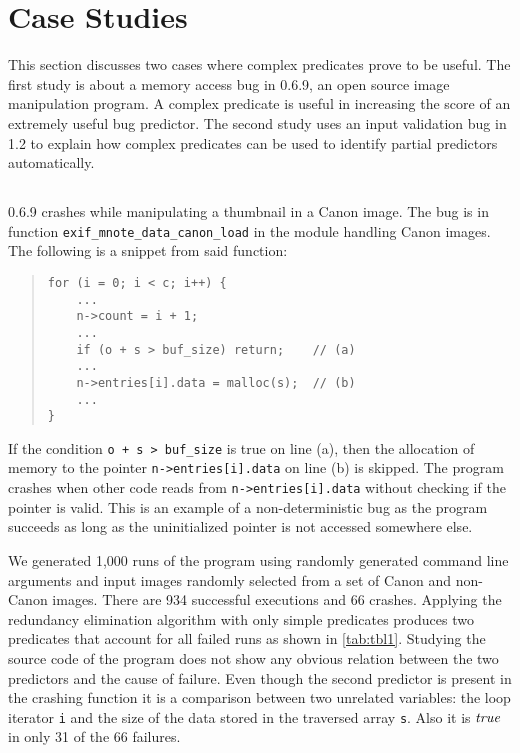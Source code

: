 
\section{Case Studies}
\label{sec-qual}
This section discusses two cases where complex predicates prove to be useful.  The first study is about a memory access bug in  0.6.9, an open source image manipulation program.  A complex predicate is useful in increasing the score of an extremely useful bug predictor.  The second study uses an input validation bug in  1.2 to explain how complex predicates can be used to identify partial predictors automatically.

\subsection{\large\textbf{}}
\label{sec-exif}

 0.6.9 crashes while manipulating a thumbnail in a Canon image.  The bug is in function \texttt{exif\_mnote\_data\_canon\_load} in the module handling Canon images.  The following is a snippet from said function:
\begin{quote}
\small
\begin{verbatim}
for (i = 0; i < c; i++) {
    ...
    n->count = i + 1;
    ...
    if (o + s > buf_size) return;    // (a)
    ...
    n->entries[i].data = malloc(s);  // (b)
    ...
}
\end{verbatim}
\end{quote}

If the condition \texttt{o + s > buf\_size} is true on line (a), then the allocation of memory to the pointer \texttt{n->entries[i].data} on line (b) is skipped.  The program crashes when other code reads from \texttt{n->entries[i].data} without checking if the pointer is valid.  This is an example of a non-deterministic bug as the program succeeds as long as the uninitialized pointer is not accessed somewhere else.

We generated 1,000 runs of the program using randomly generated command line arguments and input images randomly selected from a set of Canon and non-Canon images.  There are 934 successful executions and 66 crashes.  Applying the redundancy elimination algorithm with only simple predicates produces two predicates that account for all failed runs as shown in \autoref{tab:tbl1}.  Studying the source code of the program does not show any obvious relation between the two predictors and the cause of failure.  Even though the second predictor is present in the crashing function it is a comparison between two unrelated variables: the loop iterator \texttt{i} and the size of the data stored in the traversed array \texttt{s}.  Also it is $\mathit{true}$ in only 31 of the 66 failures.

